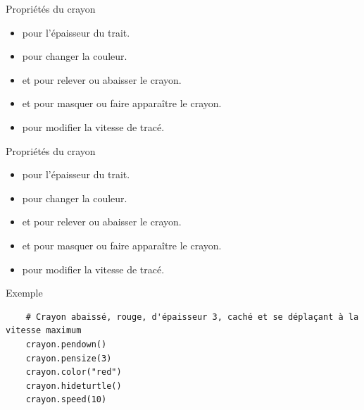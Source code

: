 \documentclass[10pt]{beamer}
\begin{document}
\begin{frame}[fragile]
	\mframe{\Turtle}
	\begin{block}{Propriétés du crayon}
		\begin{itemize}
			\item<2->  pour l'épaisseur du trait.
			\item<3->  pour changer la couleur.
			\item<4->  et  pour relever ou abaisser le crayon.
			\item<5->  et  pour masquer ou faire apparaître le crayon.
			\item<6->  pour modifier la vitesse de tracé.
		\end{itemize}
	\end{block}
\end{frame}

\begin{frame}[fragile]
	\mframe{\Turtle}
	\begin{block}{Propriétés du crayon}
		\begin{itemize}
			\item {} pour l'épaisseur du trait.
			\item {} pour changer la couleur.
			\item {} et  pour relever ou abaisser le crayon.
			\item {} et  pour masquer ou faire apparaître le crayon.
			\item {} pour modifier la vitesse de tracé.
		\end{itemize}
	\end{block}
	\begin{exampleblock}{Exemple}
		\begin{lstlisting}
	# Crayon abaissé, rouge, d'épaisseur 3, caché et se déplaçant à la vitesse maximum
	crayon.pendown()
	crayon.pensize(3)
	crayon.color("red")
	crayon.hideturtle()
	crayon.speed(10)
		\end{lstlisting}
	\end{exampleblock}
\end{frame}
\end{document}
